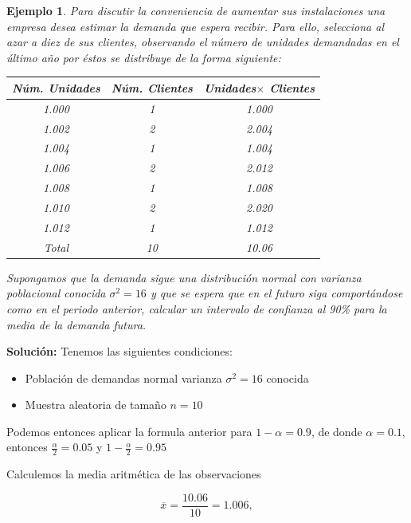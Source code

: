 \documentclass[12pt]{report}
\newtheorem{example}[definition]{Ejemplo}
\begin{document}
    \begin{example}
    Para discutir la conveniencia de aumentar sus instalaciones una
    empresa desea estimar la demanda que espera recibir. Para ello,
    selecciona al azar a diez de sus clientes, observando el n\'umero de
    unidades demandadas en el \'ultimo a\~{n}o por \'estos se distribuye de la
    forma siguiente:
\begin{center}
    \begin{tabular}{c|c|c}
        \hline
        N\'um. Unidades &  N\'um. Clientes & Unidades$\times$ Clientes\\
        \hline
        1.000 & 1 & 1.000\\
        1.002 & 2 & 2.004\\
        1.004 & 1 & 1.004\\
        1.006 & 2 & 2.012\\
        1.008 & 1 & 1.008\\
        1.010 & 2 & 2.020\\
        1.012 & 1 & 1.012\\
       \hline\hline
       Total & 10 & 10.06
        \end{tabular}
        \end{center}

        Supongamos que la demanda sigue una distribuci\'on normal con
        varianza poblacional conocida $\sigma^2=16$
        y que se espera que en el futuro siga comport\'andose como en el
        periodo anterior, calcular un intervalo de confianza al 90\% para
        la media de la demanda futura.
    \end{example}


    \textbf{Soluci\'on:}
    Tenemos las siguientes condiciones:

     \begin{itemize}
    \item Poblaci\'on de demandas normal varianza $\sigma^2=16$ conocida
    \item Muestra aleatoria de tama\~{n}o $n=10$
    \end{itemize}

    Podemos entonces aplicar la formula anterior para $1-\alpha=0.9$, de
    donde $\alpha=0.1$, entonces $\frac{\alpha}{2}= 0.05$ y
    $1-\frac{\alpha}{2}=0.95$

    Calculemos la media aritm\'etica de las observaciones

    $$\overline{x}=\frac{10.06}{10}=1.006,$$
\end{document}
